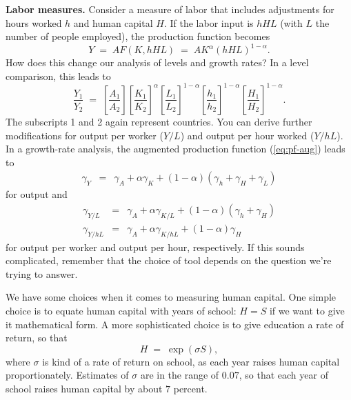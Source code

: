 \textbf{Labor measures.} Consider a measure of labor that includes
adjustments for hours worked $h$ and human capital $H$.
If the labor input is $hHL$ (with $L$ the number of people employed),
the production function becomes
\begin{equation}
    Y \;=\; A F(K,hHL) \;=\; A K^\alpha (hHL)^{1-\alpha} .
    \label{eq:pf-aug}
\end{equation}
How does this change our analysis of levels and growth rates?
In a  level comparison, this leads to
\[
    \frac{Y_1}{Y_2} \;=\;
             \left[ \frac{A_1}{A_2} \right]
             \left[ \frac{K_1}{K_2} \right]^\alpha
             \left[ \frac{L_1}{L_2} \right]^{1-\alpha}
             \left[ \frac{h_1}{h_2} \right]^{1-\alpha}
             \left[ \frac{H_1}{H_2} \right]^{1-\alpha} .
\]
The subscripts 1 and 2 again represent countries.
You can derive further modifications for output per worker ($Y/L$)
and output per hour worked ($Y/hL$).
In a growth-rate analysis,
the augmented production function (\ref{eq:pf-aug})
leads to
\begin{eqnarray*}
    \gamma_Y &=& \gamma_A + \alpha \gamma_K + (1-\alpha)
        (\gamma_h + \gamma_H + \gamma_L)
\end{eqnarray*}
for output and
\begin{eqnarray*}
    \gamma_{Y/L} &=&  \gamma_A
                + \alpha \gamma_{K/L}
                    + (1-\alpha) (\gamma_h + \gamma_H ) \\
    \gamma_{Y/hL} &=&  \gamma_A
                + \alpha \gamma_{K/hL}
                    + (1-\alpha) \gamma_H
\end{eqnarray*}
for output per worker and output per hour, respectively.
If this sounds complicated, remember that the choice of tool
depends on the question we're trying to answer.

We have some choices when it comes to measuring human capital.
One simple choice is to equate human capital with years of school:
$H = S$ if we want to give it mathematical form.
A more sophisticated choice is to give education a rate of return,
so that
\begin{equation}
    H \;=\; \exp( \sigma S ) ,
    \label{eq:mincer}
\end{equation}
where $\sigma$ is kind of a rate of return on school,
as each year raises human capital proportionately.
Estimates of $\sigma$ are in the range of $0.07$,
so that each year of school raises human capital by
about $7$ percent.


